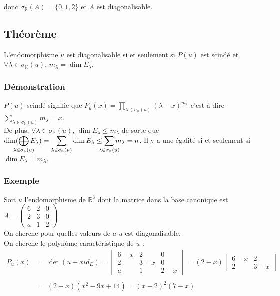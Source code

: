 \documentclass[a4paper,10pt]{book} %
\newcommand{\R}{\mathbb{R}}
\newcommand{\K}{\mathbb{K}}
\newcommand{\displayAmath}{\displaystyle}
\begin{document}
donc $\sigma_\R(A)=\{0,1,2\}$ et $A$ est diagonalisable.

\newpage

\subsection{Théorème}
L'endomorphisme $u$ est diagonalisable si et seulement si $P(u)$ est scindé et\\$\forall \lambda \in \sigma_\K(u)$, $m_\lambda=\dim E_\lambda$.

\subsubsection{Démonstration}
$P(u)$ scindé signifie que $P_u(x)=\prod_{\lambda\in \sigma_\K(u)} (\lambda-x)^{m_\lambda}$ c'est-à-dire $\sum_{\lambda\in \sigma_\K(u)}m_\lambda=x$.\\

De plus, $\forall \lambda \in \sigma_\K(u)$, $\dim E_\lambda\leq m_\lambda$ de sorte que $\displayAmath \dim(\bigoplus_{\mathclap{\lambda\in \sigma_\K(u)}}E_\lambda)=\sum_{\lambda\in \sigma_\K(u)} \dim E_\lambda\leq \sum_{\mathclap{\lambda\in \sigma_\K(u)}}m_\lambda=n$. Il y a une égalité si et seulement si $\dim E_\lambda=m_\lambda$.

\subsubsection{Exemple}
Soit $u$ l'endomorphisme de $\R^3$ dont la matrice dans la base canonique est $A=\begin{pmatrix}
6&2&0\\2&3&0\\a&1&2
\end{pmatrix}$\\

On cherche pour quelles valeurs de $a$ $u$ est diagonalisable.\\

On cherche le polynôme caractéristique de $u$ :\\

$\begin{array}{rcl}P_u(x)&=&\det(u-x id_E)=\begin{vmatrix}
6-x&2&0\\2&3-x&0\\a&1&2-x
\end{vmatrix}=(2-x)\begin{vmatrix}
6-x&2\\2&3-x
\end{vmatrix}\\\\&=&(2-x)(x^2-9x+14)=(x-2)^2(7-x)\end{array}$\\
\end{document}
